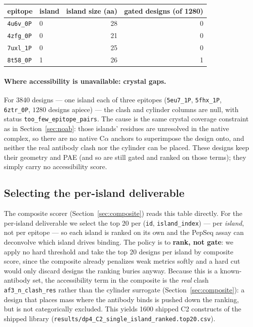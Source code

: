 \begin{center}
\begin{tabular}{llrr}
\toprule
epitope & island & island size (aa) & gated designs (of \num{1280}) \\
\midrule
\texttt{4u6v\_0P} & 0 & 28 & 0 \\
\texttt{4zfg\_0P} & 0 & 21 & 0 \\
\texttt{7uxl\_1P} & 0 & 25 & 0 \\
\texttt{8t58\_0P} & 1 & 26 & 1 \\
\bottomrule
\end{tabular}
\label{tab:shortislands}
\end{center}

\paragraph{Where accessibility is unavailable: crystal gaps.}
For \num{3840} designs --- one island each of three epitopes (\texttt{5eu7\_1P},
\texttt{5fhx\_1P}, \texttt{6ztr\_0P}, $\num{1280}$ designs apiece) --- the clash and cylinder
columns are null, with status \texttt{too\_few\_epitope\_pairs}. The cause is the same crystal
coverage constraint as in Section~\ref{sec:noab}: those islands' residues are unresolved in
the native complex, so there are no native C$\alpha$ anchors to superimpose the design onto,
and neither the real antibody clash nor the cylinder can be placed. These designs keep their
geometry and PAE (and so are still gated and ranked on those terms); they simply carry no
accessibility score.

\subsection{Selecting the per-island deliverable}\label{sec:selection}
The composite scorer (Section~\ref{sec:composite}) reads this table directly. For the
per-island deliverable we select the top \num{20} per (\texttt{id}, \texttt{island\_index}) ---
per \emph{island}, not per epitope --- so each island is ranked on its own and the PepSeq
assay can deconvolve which island drives binding. The policy is to \textbf{rank, not gate}: we
apply no hard threshold and take the top \num{20} designs per island by composite score, since the
composite already penalizes weak metrics softly and a hard cut would only discard designs the
ranking buries anyway. Because this is a known-antibody set, the accessibility term in the
composite is the \emph{real} clash \texttt{af3\_n\_clash\_res} rather than the cylinder surrogate
(Section~\ref{sec:composite}): a design that places mass where the antibody binds is pushed down
the ranking, but is not categorically excluded. This yields \num{1600} shipped C2 constructs of the
shipped library (\texttt{results/dp4\_C2\_single\_island\_ranked.top20.csv}).

